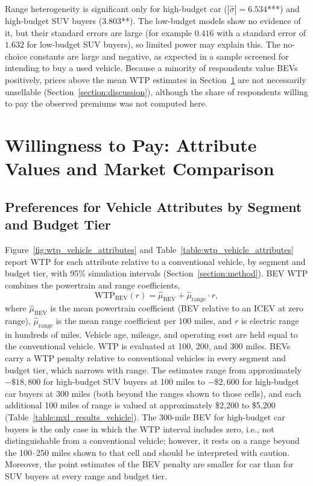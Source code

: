 \documentclass[a4paper,fleqn]{cas-sc}   %
\begin{document}
Range heterogeneity is significant only for high-budget car ($|\hat{\sigma}| = 6.534$***) and high-budget SUV buyers ($3.803$**). The low-budget models show no evidence of it, but their standard errors are large (for example $0.416$ with a standard error of $1.632$ for low-budget SUV buyers), so limited power may explain this. The no-choice constants are large and negative, as expected in a sample screened for intending to buy a used vehicle. Because a minority of respondents value BEVs positively, prices above the mean WTP estimates in Section~\ref{section:analysis} are not necessarily unsellable (Section~\ref{section:discussion}), although the share of respondents willing to pay the observed premiums was not computed here.


\section{Willingness to Pay: Attribute Values and Market Comparison}
\label{section:analysis}

\subsection{Preferences for Vehicle Attributes by Segment and Budget Tier}
\label{subsec:wtp_vehicle_attributes}

Figure~\ref{fig:wtp_vehicle_attributes} and Table~\ref{table:wtp_vehicle_attributes} report WTP for each attribute relative to a conventional vehicle, by segment and budget tier, with 95\% simulation intervals (Section~\ref{section:method}). BEV WTP combines the powertrain and range coefficients,
\begin{equation}
\text{WTP}_{\text{BEV}}(r) = \hat{\mu}_{\mathrm{BEV}} + \hat{\mu}_{\mathrm{range}} \cdot r,
\label{eq:bev_wtp}
\end{equation}
\noindent where $\hat{\mu}_{\mathrm{BEV}}$ is the mean powertrain coefficient (BEV relative to an ICEV at zero range), $\hat{\mu}_{\mathrm{range}}$ is the mean range coefficient per 100 miles, and $r$ is electric range in hundreds of miles. Vehicle age, mileage, and operating cost are held equal to the conventional vehicle. WTP is evaluated at 100, 200, and 300 miles. BEVs carry a WTP penalty relative to conventional vehicles in every segment and budget tier, which narrows with range. The estimates range from approximately $-\$18,800$ for high-budget SUV buyers at 100 miles to $-\$2,600$ for high-budget car buyers at 300 miles (both beyond the ranges shown to those cells), and each additional 100 miles of range is valued at approximately \$2,200 to \$5,200 (Table~\ref{table:mxl_results_vehicle}). The 300-mile BEV for high-budget car buyers is the only case in which the WTP interval includes zero, i.e., not distinguishable from a conventional vehicle; however, it rests on a range beyond the 100--250 miles shown to that cell and should be interpreted with caution. Moreover, the point estimates of the BEV penalty are smaller for car than for SUV buyers at every range and budget tier.
\end{document}
